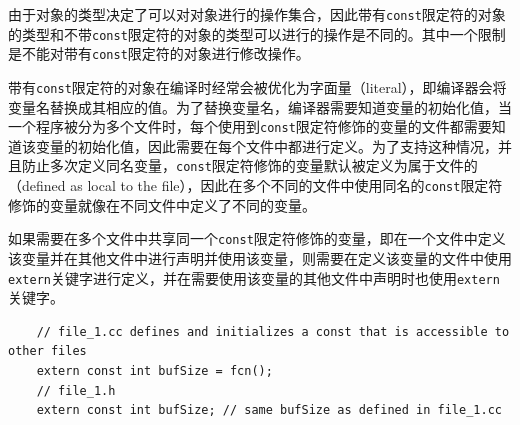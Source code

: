 由于对象的类型决定了可以对对象进行的操作集合，因此带有\texttt{const}限定符的对象的类型和不带\texttt{const}限定符的对象的类型可以进行的操作是不同的。其中一个限制是不能对带有\texttt{const}限定符的对象进行修改操作。

带有\texttt{const}限定符的对象在编译时经常会被优化为字面量（literal），即编译器会将变量名替换成其相应的值。为了替换变量名，编译器需要知道变量的初始化值，当一个程序被分为多个文件时，每个使用到\texttt{const}限定符修饰的变量的文件都需要知道该变量的初始化值，因此需要在每个文件中都进行定义。为了支持这种情况，并且防止多次定义同名变量，\texttt{const}限定符修饰的变量默认被定义为属于文件的（defined as local to the file），因此在多个不同的文件中使用同名的\texttt{const}限定符修饰的变量就像在不同文件中定义了不同的变量。

如果需要在多个文件中共享同一个\texttt{const}限定符修饰的变量，即在一个文件中定义该变量并在其他文件中进行声明并使用该变量，则需要在定义该变量的文件中使用\texttt{extern}关键字进行定义，并在需要使用该变量的其他文件中声明时也使用\texttt{extern}关键字。

\begin{verbatim}
    // file_1.cc defines and initializes a const that is accessible to other files
    extern const int bufSize = fcn();
    // file_1.h
    extern const int bufSize; // same bufSize as defined in file_1.cc
\end{verbatim}


